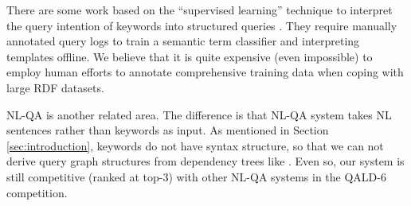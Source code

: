 There are some work based on the ``supervised learning'' technique to interpret the query intention of keywords into structured queries \cite{pound2012interpreting}. They require manually annotated query logs to train a semantic term classifier and interpreting templates offline. We believe that it is quite expensive (even impossible) to employ human efforts to annotate comprehensive training data when coping with large RDF datasets. 

NL-QA \cite{unger2012template,yahya2012natural,zou2014natural} is another related area. The difference is that NL-QA system takes NL sentences rather than keywords as input. As mentioned in Section \ref{sec:introduction}, keywords do not have syntax structure, so that we can not derive query graph structures from dependency trees \cite{de2008stanford} like \cite{yahya2012natural,zou2014natural}. Even so, our system is still competitive (ranked at top-3) with other NL-QA systems in the QALD-6 competition. 